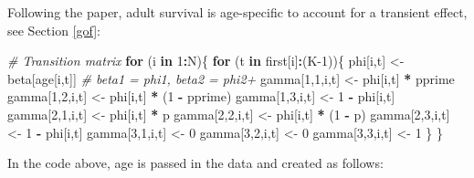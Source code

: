 \documentclass[
  12pt,
]{krantz}
\newenvironment{Shaded}{\begin{snugshade}}{\end{snugshade}}
\newcommand{\CommentTok}[1]{\textcolor[rgb]{0.56,0.35,0.01}{\textit{#1}}}
\newcommand{\ControlFlowTok}[1]{\textcolor[rgb]{0.13,0.29,0.53}{\textbf{#1}}}
\newcommand{\DecValTok}[1]{\textcolor[rgb]{0.00,0.00,0.81}{#1}}
\newcommand{\NormalTok}[1]{#1}
\newcommand{\OtherTok}[1]{\textcolor[rgb]{0.56,0.35,0.01}{#1}}
\newcommand{\SpecialCharTok}[1]{\textcolor[rgb]{0.81,0.36,0.00}{\textbf{#1}}}
\begin{document}
Following the paper, adult survival is age-specific to account for a transient effect, see Section \ref{gof}:

\begin{Shaded}
\begin{Highlighting}[]
\CommentTok{\# Transition matrix}
  \ControlFlowTok{for}\NormalTok{ (i }\ControlFlowTok{in} \DecValTok{1}\SpecialCharTok{:}\NormalTok{N)\{}
    \ControlFlowTok{for}\NormalTok{ (t }\ControlFlowTok{in}\NormalTok{ first[i]}\SpecialCharTok{:}\NormalTok{(K}\DecValTok{{-}1}\NormalTok{))\{}
\NormalTok{      phi[i,t] }\OtherTok{\textless{}{-}}\NormalTok{ beta[age[i,t]] }\CommentTok{\# beta1 = phi1, beta2 = phi2+}
\NormalTok{      gamma[}\DecValTok{1}\NormalTok{,}\DecValTok{1}\NormalTok{,i,t] }\OtherTok{\textless{}{-}}\NormalTok{ phi[i,t] }\SpecialCharTok{*}\NormalTok{ pprime}
\NormalTok{      gamma[}\DecValTok{1}\NormalTok{,}\DecValTok{2}\NormalTok{,i,t] }\OtherTok{\textless{}{-}}\NormalTok{ phi[i,t] }\SpecialCharTok{*}\NormalTok{ (}\DecValTok{1} \SpecialCharTok{{-}}\NormalTok{ pprime)}
\NormalTok{      gamma[}\DecValTok{1}\NormalTok{,}\DecValTok{3}\NormalTok{,i,t] }\OtherTok{\textless{}{-}} \DecValTok{1} \SpecialCharTok{{-}}\NormalTok{ phi[i,t]}
\NormalTok{      gamma[}\DecValTok{2}\NormalTok{,}\DecValTok{1}\NormalTok{,i,t] }\OtherTok{\textless{}{-}}\NormalTok{ phi[i,t] }\SpecialCharTok{*}\NormalTok{ p}
\NormalTok{      gamma[}\DecValTok{2}\NormalTok{,}\DecValTok{2}\NormalTok{,i,t] }\OtherTok{\textless{}{-}}\NormalTok{ phi[i,t] }\SpecialCharTok{*}\NormalTok{ (}\DecValTok{1} \SpecialCharTok{{-}}\NormalTok{ p)}
\NormalTok{      gamma[}\DecValTok{2}\NormalTok{,}\DecValTok{3}\NormalTok{,i,t] }\OtherTok{\textless{}{-}} \DecValTok{1} \SpecialCharTok{{-}}\NormalTok{ phi[i,t] }
\NormalTok{      gamma[}\DecValTok{3}\NormalTok{,}\DecValTok{1}\NormalTok{,i,t] }\OtherTok{\textless{}{-}} \DecValTok{0}
\NormalTok{      gamma[}\DecValTok{3}\NormalTok{,}\DecValTok{2}\NormalTok{,i,t] }\OtherTok{\textless{}{-}} \DecValTok{0} 
\NormalTok{      gamma[}\DecValTok{3}\NormalTok{,}\DecValTok{3}\NormalTok{,i,t] }\OtherTok{\textless{}{-}} \DecValTok{1}
\NormalTok{    \}}
\NormalTok{  \}}
\end{Highlighting}
\end{Shaded}

In the code above, age is passed in the data and created as follows:
\end{document}
